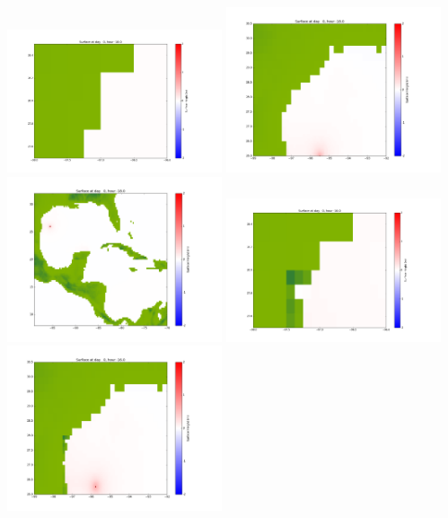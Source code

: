 \documentclass[11pt]{article}
\begin{document}
\vskip 10pt 
\includegraphics[width=0.475\textwidth]{frame0015fig1001.png}
\includegraphics[width=0.475\textwidth]{frame0015fig1002.png}
\vskip 10pt 
\includegraphics[width=0.475\textwidth]{frame0015fig1003.png}
\vskip 10pt 
\includegraphics[width=0.475\textwidth]{frame0016fig1001.png}
\includegraphics[width=0.475\textwidth]{frame0016fig1002.png}
\end{document}
